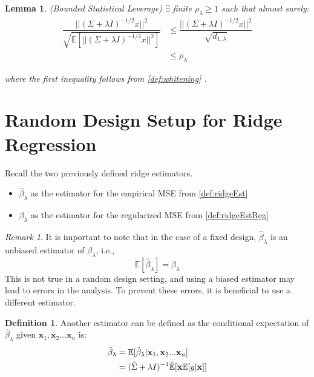 \documentclass[nohyperref]{article}
\theoremstyle{plain}
\newtheorem{lemma}[theorem]{Lemma}
\theoremstyle{definition}
\newtheorem{definition}[theorem]{Definition}
\theoremstyle{remark}
\newtheorem{remark}[theorem]{Remark}
\begin{document}
\begin{lemma}
\label{lem:boundedLeverage}
(Bounded Statistical Leverage) $\exists$ finite $\rho_{\lambda} \geq 1$ such that almost surely:
\begin{align*}
    \dfrac{||(\Sigma + \lambda I)^{-1/2}x||^2}{\sqrt{\mathbb{E}[||(\Sigma + \lambda I)^{-1/2}x||^2]}} &\leq \dfrac{||(\Sigma + \lambda I)^{-1/2}x||^2}{\sqrt{d_{1, \lambda}}}\\
        &\leq \rho_{\lambda}
\end{align*}

where the first inequality follows from \cref{def:whitening} \cite{HKZ2014}.
\end{lemma}



\pagebreak


\section{Random Design Setup for Ridge Regression}

Recall the two previously defined ridge estimators. 
\begin{itemize}
    \item $\hat{\beta}_{\lambda}$ as the estimator for the empirical MSE from \cref{def:ridgeEst}
    \item $\beta_{\lambda}$ as the estimator for the regularized MSE from \cref{def:ridgeEstReg}
\end{itemize}

\begin{remark}
It is important to note that in the case of a fixed design, $\hat{\beta}_{\lambda}$ is an unbiased estimator of $\beta_{\lambda}$, i.e.,
$$\mathbb{E}[\hat{\beta}_{\lambda}] = \beta_{\lambda}$$
This is not true in a random design setting, and using a biased estimator may lead to errors in the analysis. To prevent these errors, it is beneficial to use a different estimator. \cite{HKZ2011}
\end{remark}

\begin{definition}
\label{def:condExpBeta}
Another estimator can be defined as the conditional expectation of $\hat{\beta}_{\lambda}$ given $\textbf{x}_1, \textbf{x}_2...\textbf{x}_n$ is: 
\begin{align*}
    \Bar{\beta}_{\lambda} &= \mathbb{E}[\hat{\beta}_{\lambda} | \textbf{x}_1, \textbf{x}_2...\textbf{x}_n] \\
    &= (\hat{\Sigma} + \lambda I)^{-1}\hat{\mathbb{E}}[\textbf{x} \mathbb{E}[y|\textbf{x}]]
\end{align*}
\end{definition}
\end{document}
